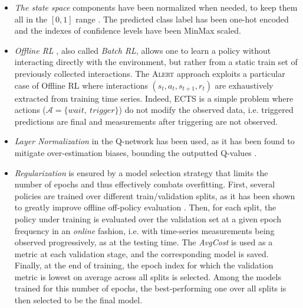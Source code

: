 \documentclass[sigconf, nonacm, table]{acmart}
\begin{document}
\begin{itemize}

    \item \textit{The state space} components have been normalized when needed, to keep them all in the $[0,1]$ range \cite{tarasov2024revisiting, fujimoto2021minimalist}. The predicted class label has been one-hot encoded and the indexes of confidence levels have been MinMax scaled.

    \item \textit{Offline RL} \cite{levine2020offline, prudencio2023survey}, also called \textit{Batch RL}, allows one to learn a policy without interacting directly with the environment, but rather from a static train set of previously collected interactions. The \textsc{Alert} approach exploits a particular case of Offline RL where interactions $(s_t, a_t, s_{t+1}, r_t)$ are exhaustively extracted from training time series. Indeed, ECTS is a simple problem where actions ($\mathcal{A} = \{wait,\:trigger \}$) do not modify the observed data, i.e. triggered predictions are final and measurements after triggering are not observed. %

    \item \textit{Layer Normalization} \cite{lei2016layer} in the Q-network has been used, as it has been found to mitigate over-estimation biases, bounding the outputted Q-values \cite{ball2023efficient, tarasov2024revisiting}. 

    \item %
    \textit{Regularization} is ensured by a model selection strategy that limits the number of epochs and thus effectively combats overfitting. 
    First, several policies are trained over different train/validation splits, as it has been shown to greatly improve offline off-policy evaluation \cite{nie2022data}. Then, for each split, the policy under training is evaluated over the validation set at a given epoch frequency in an \textit{online} fashion, i.e. 
    with time-series measurements being observed progressively, as at the testing time. The \textit{AvgCost} is used as a metric at each validation stage, and the corresponding model is saved. Finally, at the end of training, the epoch index for which the validation metric is lowest on average across all splits is selected. 
    Among the models trained for this number of epochs, the best-performing one over all splits is then selected to be the final model.
\end{itemize}
\end{document}
